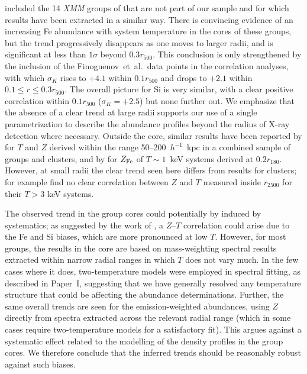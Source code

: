 \documentclass[useAMS,usenatbib]{mn2e}
\begin{document}
included the 14 {\em XMM} groups of \citet{fino06,fino07} that are not
part of our sample and for which results have been extracted in a
similar way. There is convincing evidence of an increasing Fe
abundance with system temperature in the cores of these groups, but
the trend progressively disappears as one moves to larger radii, and
is significant at less than $1\sigma$ beyond $0.3r_{500}$. This
conclusion is only strengthened by the inclusion of the
Finoguenov~et~al.\ data points in the correlation analyses, with which
$\sigma_K$ rises to $+4.1$ within $0.1r_{500}$ and drops to $+2.1$
within $0.1\le r \le 0.3r_{500}$.  The overall picture for Si is very
similar, with a clear positive correlation within $0.1r_{500}$
($\sigma_K=+2.5$) but none further out. We emphasize that the absence
of a clear trend at large radii supports our use of a single
parametrization to describe the abundance profiles beyond the radius
of X-ray detection where necessary. Outside the core, similar results
have been reported by \citet{tamu04} for $T$ and $Z$ derived within
the range 50--200~$h^{-1}$~kpc in a combined sample of groups and
clusters, and by \citet{fino01} for $Z_{\rm Fe}$ of $T\sim 1$~keV
systems derived at $0.2r_{180}$. However, at small radii the clear
trend seen here differs from results for clusters; for example
\citet{degr04} find no clear correlation between $Z$ and $T$ measured
inside $r_{2500}$ for their $T>3$ keV systems.

The observed trend in the group cores could potentially by induced by
systematics; as suggested by the work of \citet{buot00a}, a $Z$--$T$
correlation could arise due to the Fe and Si biases, which are more
pronounced at low $T$. However, for most groups, the results in the
core are based on mass-weighting spectral results extracted within
narrow radial ranges in which $T$ does not vary much. In the few cases
where it does, two-temperature models were employed in spectral
fitting, as described in Paper~I, suggesting that we have generally
resolved any temperature structure that could be affecting the
abundance determinations.  Further, the same overall trends are seen
for the emission-weighted abundances, using $Z$ directly from spectra
extracted across the relevant radial range (which in some cases
require two-temperature models for a satisfactory fit). This argues
against a systematic effect related to the modelling of the density
profiles in the group cores.  We therefore conclude that the inferred
trends should be reasonably robust against such biases.
\end{document}
